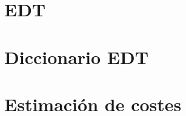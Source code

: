 \documentclass[a4paper,10pt]{scrartcl}
\begin{document}
\section{EDT}

\section{Diccionario EDT}

\section{Estimación de costes}



\end{document}
